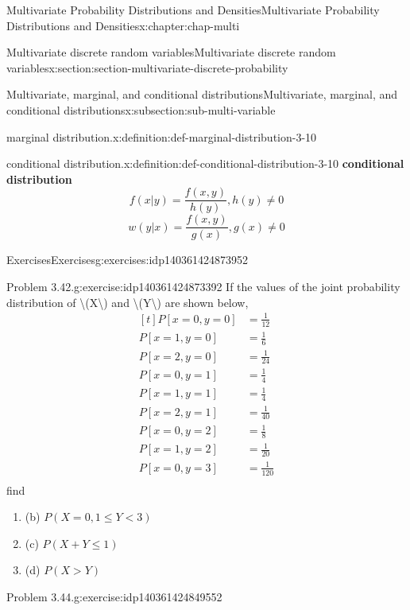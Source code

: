 \documentclass[oneside,10pt,]{book}
\newcommand{\terminology}[1]{\textbf{#1}}
\numberwithin{equation}{section}
\newcommand{\lt}{<}
\newcommand{\gt}{>}
\newcommand{\amp}{&}
\begin{document}
\begin{chapterptx}{Multivariate Probability Distributions and Densities}{}{Multivariate Probability Distributions and Densities}{}{}{x:chapter:chap-multi}
\begin{sectionptx}{Multivariate discrete random variables}{}{Multivariate discrete random variables}{}{}{x:section:section-multivariate-discrete-probability}
\begin{subsectionptx}{Multivariate, marginal, and conditional distributions}{}{Multivariate, marginal, and conditional distributions}{}{}{x:subsection:sub-multi-variable}
\begin{definition}{marginal distribution.}{x:definition:def-marginal-distribution-3-10}
\end{definition}
\begin{definition}{conditional distribution.}{x:definition:def-conditional-distribution-3-10}%
\terminology{conditional distribution}%
\begin{equation*}
f(x|y) = \dfrac{f(x, y)}{h(y)}, h(y)\ne 0
\end{equation*}
%
\begin{equation*}
w(y|x) = \dfrac{f(x, y)}{g(x)}, g(x)\ne 0
\end{equation*}
%
\end{definition}
\end{subsectionptx}
%
%
\typeout{************************************************}
\typeout{************************************************}
%
\begin{exercises-subsection}{Exercises}{}{Exercises}{}{}{g:exercises:idp140361424873952}
\begin{divisionexercise}{1}{Problem 3.42.}{}{g:exercise:idp140361424873392}%
If the values of the joint probability distribution of \textbackslash{}(X\textbackslash{}) and \textbackslash{}(Y\textbackslash{}) are shown below,%
\begin{equation*}
\begin{aligned}[t]
P[x=0, y=0] \amp = \frac{1}{12}\\
P[x=1, y=0] \amp = \frac{1}{6}\\
P[x=2, y=0] \amp = \frac{1}{24}\\
P[x=0, y=1] \amp = \frac{1}{4}\\
P[x=1, y=1] \amp = \frac{1}{4}\\
P[x=2, y=1] \amp = \frac{1}{40}\\
P[x=0, y=2] \amp = \frac{1}{8}\\
P[x=1, y=2] \amp = \frac{1}{20}\\
P[x=0, y=3] \amp = \frac{1}{120}\\
\end{aligned}
\end{equation*}
find%
\begin{enumerate}[label=(\alph*)]
\item{}(b) \(P(X = 0, 1\le Y \lt 3)\)%
\item{}(c) \(P(X + Y \le 1)\)%
\item{}(d) \(P(X \gt Y)\)%
\end{enumerate}
%
\end{divisionexercise}%
\begin{divisionexercise}{2}{Problem 3.44.}{}{g:exercise:idp140361424849552}%

\end{divisionexercise}
\end{exercises-subsection}
\end{sectionptx}
\end{chapterptx}
\end{document}
